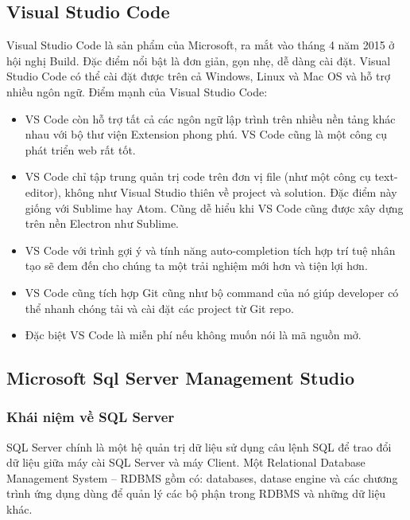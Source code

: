 \subsection{Visual Studio Code}
Visual Studio Code là sản phẩm của Microsoft, ra mắt vào tháng 4 năm 2015 ở hội nghị Build. Đặc điểm nổi bật là đơn giản, gọn nhẹ, dễ dàng cài đặt. Visual Studio Code có thể cài đặt được trên cả Windows, Linux và Mac OS và hỗ trợ nhiều ngôn ngữ. Điểm mạnh của Visual Studio Code:
\begin{itemize}
	\item VS Code còn hỗ trợ tất cả các ngôn ngữ lập trình trên nhiều nền tảng khác nhau với bộ thư viện Extension phong phú. VS Code cũng là một công cụ phát triển web rất tốt.
	\item VS Code chỉ tập trung quản trị code trên đơn vị file (như một công cụ text-editor), không như Visual Studio thiên về project và solution. Đặc điểm này giống với Sublime hay Atom. Cũng dễ hiểu khi VS Code cũng được xây dựng trên nền Electron như Sublime.
	\item VS Code với trình gợi ý và tính năng auto-completion tích hợp trí tuệ nhân tạo sẽ đem đến cho chúng ta một trải nghiệm mới hơn và tiện lợi hơn.
	\item VS Code cũng tích hợp Git cũng như bộ command của nó giúp developer có thể nhanh chóng tải và cài đặt các project từ Git repo.
	\item Đặc biệt VS Code là miễn phí nếu không muốn nói là mã nguồn mở.
\end{itemize}
\subsection{Microsoft Sql Server Management Studio}
\subsubsection{Khái niệm về SQL Server}
SQL Server chính là một hệ quản trị dữ liệu sử dụng câu lệnh SQL để trao đổi dữ liệu giữa máy cài SQL Server và máy Client. Một Relational Database Management System – RDBMS gồm có: databases, datase engine và các chương trình ứng dụng dùng để quản lý các bộ phận trong RDBMS và những dữ liệu khác.

